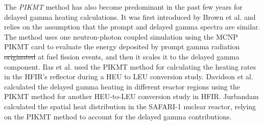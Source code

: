 \documentclass{style/nseJournal}
\providecommand{\DIFadd}[1]{{\protect\color{blue}\uwave{#1}}} %
\providecommand{\DIFdel}[1]{{\protect\color{red}\sout{#1}}}                      %
\providecommand{\DIFaddbegin}{} %
\providecommand{\DIFaddend}{} %
\providecommand{\DIFdelbegin}{} %
\providecommand{\DIFdelend}{} %
\begin{document}

The \textit{PIKMT} method has also become predominant in the past few years for delayed gamma heating calculations.
It was first introduced by Brown et al. \cite{brown_monte_2008} and relies on the assumption that the prompt and delayed gamma spectra are similar.
The method uses one neutron-photon coupled simulation using the MCNP PIKMT card to evaluate the energy deposited by prompt gamma radiation \DIFdelbegin \DIFdel{originated }\DIFdelend \DIFaddbegin \DIFadd{originating }\DIFaddend at fuel fission events, and then it scales it to the delayed gamma component.
Ilas et al. \cite{ilas_impact_2013} used the PIKMT method for calculating the heating rates in the \gls*{HFIR}’s reflector during a \gls*{HEU} to \gls*{LEU} conversion study.
Davidson et al. \cite{davidson_heat_2017} calculated the delayed gamma heating in different reactor regions using the PIKMT method for another HEU-to-LEU conversion study in HFIR.
Jurbandam \cite{jurbandam_calculation_2018} calculated the spatial heat distribution in the SAFARI-1 nuclear reactor, relying on the PIKMT method to account for the delayed gamma contributions.
\end{document}
